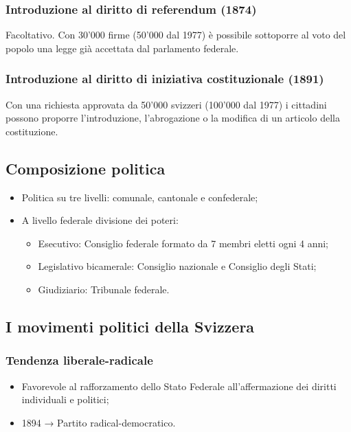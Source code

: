 \documentclass{article}
\begin{document}
\subsubsection{Introduzione al diritto di referendum (1874)}
Facoltativo. Con 30'000 firme (50'000 dal 1977) è possibile sottoporre al voto del popolo una
legge già accettata dal parlamento federale.

\subsubsection{Introduzione al diritto di iniziativa costituzionale (1891)}
Con una richiesta approvata da 50'000 svizzeri (100'000 dal 1977) i cittadini possono proporre
l’introduzione, l’abrogazione o la modifica di un articolo della costituzione.

\subsection{Composizione politica}
\begin{itemize}
    \item Politica su tre livelli: comunale, cantonale e confederale;
    \item A livello federale divisione dei poteri:
        \begin{itemize}
            \item Esecutivo: Consiglio federale formato da 7 membri eletti ogni 4 anni;
            \item Legislativo bicamerale: Consiglio nazionale e Consiglio degli Stati;
            \item Giudiziario: Tribunale federale.
        \end{itemize}
\end{itemize}

\subsection{I movimenti politici della Svizzera}

\subsubsection{Tendenza liberale-radicale}
\begin{itemize}
    \item Favorevole al rafforzamento dello Stato Federale all’affermazione dei diritti
        individuali e politici;
    \item 1894 → Partito radical-democratico.
\end{itemize}
\end{document}

